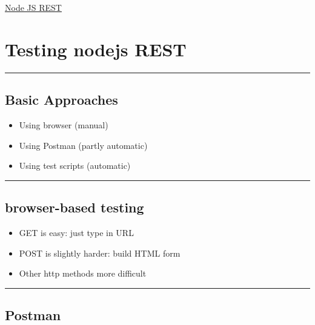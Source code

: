 \documentclass{article}[18pt]
\providecommand{\tightlist}{%
  \setlength{\itemsep}{0pt}\setlength{\parskip}{0pt}}
\begin{document}
\begin{center}
\underline{\huge Node JS REST}
\end{center}
\section{Testing nodejs REST}\label{testing-nodejs-rest}

\begin{center}\rule{0.5\linewidth}{\linethickness}\end{center}

\hypertarget{basic-approaches}{%
\subsection{Basic Approaches}\label{basic-approaches}}

\begin{itemize}
\tightlist
\item
  Using browser (manual)
\item
  Using Postman (partly automatic)
\item
  Using test scripts (automatic)
\end{itemize}

\begin{center}\rule{0.5\linewidth}{\linethickness}\end{center}

\hypertarget{browser-based-testing}{%
\subsection{browser-based testing}\label{browser-based-testing}}

\begin{itemize}
\tightlist
\item
  GET is easy: just type in URL
\item
  POST is slightly harder: build HTML form
\item
  Other http methods more difficult
\end{itemize}

\begin{center}\rule{0.5\linewidth}{\linethickness}\end{center}

\hypertarget{postman}{%
\subsection{Postman}\label{postman}}
\end{document}

